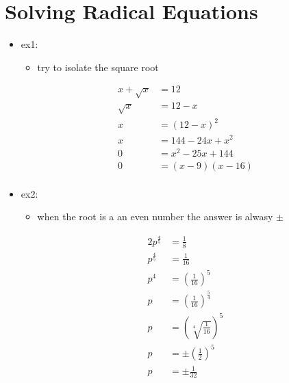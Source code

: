 \documentclass[11pt]{article}
\begin{document}
\section{Solving Radical Equations}
\label{sec:org94867a6}
\begin{itemize}
\item ex1:
\begin{itemize}
\item try to isolate the square root
\end{itemize}
\begin{align*}
  x + \sqrt{x} &= 12\\
  \sqrt{x} &= 12 - x\\
  x        &= (12 - x)^2\\
  x &= 144 - 24x + x^2\\
  0 &= x^2 - 25x + 144\\
  0 &= (x - 9)(x - 16)\\
\end{align*}

\item ex2:
\begin{itemize}
\item when the root is a an even number the answer is alwasy \(\pm\)
\end{itemize}
\begin{align*}
2p^{\frac{4}{5}} &= \frac{1}{8}\\
p^{\frac{4}{5}} &= \frac{1}{16}\\
p^4 &= (\frac{1}{16})^5\\
p &= (\frac{1}{16})^{\frac{5}{4}}\\
p &= (\sqrt[4]{\frac{1}{16}})^5\\
p &= \pm (\frac{1}{2})^5\\
p &= \pm \frac{1}{32}\\
\end{align*}
\end{itemize}
\end{document}
